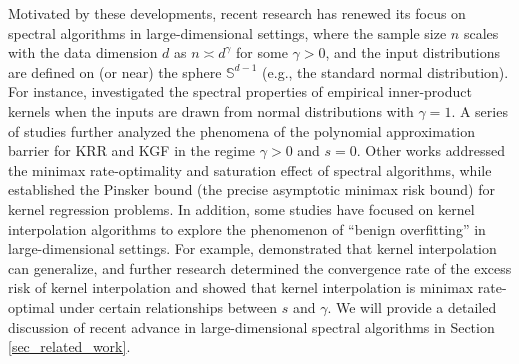 \documentclass{article}
\theoremstyle{plain}
\theoremstyle{definition}
\theoremstyle{remark}
\begin{document}
Motivated by these developments, recent research has renewed its focus on spectral algorithms in large-dimensional settings, where the sample size $n$ scales with the data dimension $d$ as $n \asymp d^{\gamma}$ for some $\gamma > 0$, and the input distributions are defined on (or near) the sphere  $\mathbb{S}^{d-1}$ (e.g., the standard normal distribution).
For instance, \cite{Karoui_spectrum_2010} investigated the spectral properties of empirical inner-product kernels when the inputs are drawn from normal distributions with $\gamma = 1$. A series of studies \citep{Liang_Just_2019, liang2020multiple, Ghorbani_When_2021, ghorbani2021linearized, mei2021learning, mei2022generalization, misiakiewicz_learning_2021, aerni2023strong, barzilai2023generalization, Ghosh_three_2021} further analyzed the phenomena of the polynomial approximation barrier for KRR and KGF in the regime $\gamma>0$ and $s=0$. Other works \citep{lu2023optimal, zhang2024optimal, lu2024saturation} addressed the minimax rate-optimality and saturation effect of spectral algorithms, while \cite{lu2024pinsker} established the Pinsker bound (the precise asymptotic minimax risk bound) for kernel regression problems. 
In addition, some studies have focused on kernel interpolation algorithms to explore the phenomenon of ``benign overfitting'' in large-dimensional settings. For example,  \cite{Liang_Just_2019} demonstrated that kernel interpolation can generalize, and further research \citep{liang2020multiple, aerni2023strong, barzilai2023generalization, zhang2024phase} determined the convergence rate of the excess risk of kernel interpolation and showed that kernel interpolation is minimax rate-optimal under certain relationships between $s$ and $\gamma$.
We will provide a detailed discussion of recent advance in large-dimensional spectral algorithms in Section \ref{sec_related_work}.
\end{document}
